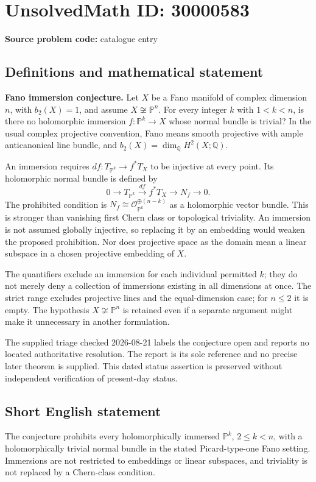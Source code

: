 \documentclass[11pt]{article}
\newcommand{\Q}{\mathbb{Q}}
\newcommand{\PP}{\mathbb{P}}
\begin{document}
\section*{UnsolvedMath ID: 30000583}
\textbf{Source problem code:} catalogue entry
\subsection{Definitions and mathematical statement}
\textbf{Fano immersion conjecture.} Let \(X\) be a Fano manifold of complex dimension \(n\), with \(b_2(X)=1\), and assume \(X\not\cong\PP^n\). For every integer \(k\) with \(1<k<n\), is there no holomorphic immersion \(f:\PP^k\to X\) whose normal bundle is trivial? In the usual complex projective convention, Fano means smooth projective with ample anticanonical line bundle, and \(b_2(X)=\dim_\Q H^2(X;\Q)\).\par An immersion requires \(df:T_{\PP^k}\to f^*T_X\) to be injective at every point. Its holomorphic normal bundle is defined by\[0\longrightarrow T_{\PP^k}\xrightarrow{df}f^*T_X\longrightarrow N_f\longrightarrow0.\] The prohibited condition is \(N_f\cong\mathcal O_{\PP^k}^{\oplus(n-k)}\) as a holomorphic vector bundle. This is stronger than vanishing first Chern class or topological triviality. An immersion is not assumed globally injective, so replacing it by an embedding would weaken the proposed prohibition. Nor does projective space as the domain mean a linear subspace in a chosen projective embedding of \(X\).\par The quantifiers exclude an immersion for each individual permitted \(k\); they do not merely deny a collection of immersions existing in all dimensions at once. The strict range excludes projective lines and the equal-dimension case; for \(n\le2\) it is empty. The hypothesis \(X\not\cong\PP^n\) is retained even if a separate argument might make it unnecessary in another formulation.\par The supplied triage checked 2026-08-21 labels the conjecture open and reports no located authoritative resolution. The report is its sole reference and no precise later theorem is supplied. This dated status assertion is preserved without independent verification of present-day status.
\subsection{Short English statement}
The conjecture prohibits every holomorphically immersed \(\PP^k\), \(2\le k<n\), with a holomorphically trivial normal bundle in the stated Picard-type-one Fano setting. Immersions are not restricted to embeddings or linear subspaces, and triviality is not replaced by a Chern-class condition.
\end{document}
